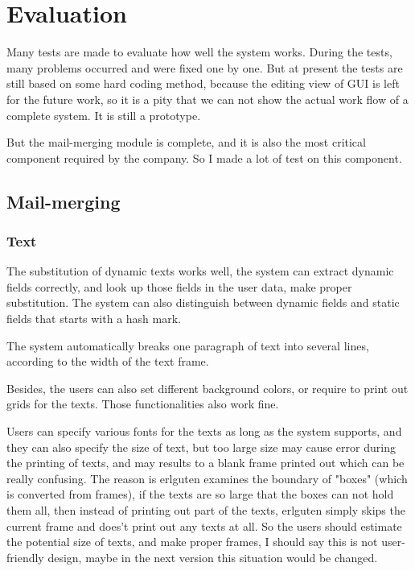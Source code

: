 \documentclass[12pt,twoside,a4paper]{report}
\begin{document}
\chapter{Evaluation}
  
  Many tests are made to evaluate how well the system works. During the tests, many problems occurred and were fixed one by one. But at present the tests are still based on some hard coding method, because the editing view of GUI is left for the future work, so it is a pity that we can not show the actual work flow of a complete system. It is still a prototype.

  But the mail-merging module is complete, and it is also the most critical component required by the company. So I made a lot of test on this component.
  
\section{Mail-merging}
\subsection{Text}

  The substitution of dynamic texts works well, the system can extract dynamic fields correctly, and look up those fields in the user data, make proper substitution. The system can also distinguish between dynamic fields and static fields that starts with a hash mark. 

  The system automatically breaks one paragraph of text into several lines, according to the width of the text frame. 

  Besides, the users can also set different background colors, or require to print out grids for the texts. Those functionalities also work fine.

  Users can specify various fonts for the texts as long as the system supports, and they can also specify the size of text, but too large size may cause error during the printing of texts, and may results to a blank frame printed out which can be really confusing. The reason is erlguten examines the boundary of "boxes" (which is converted from frames), if the texts are so large that the boxes can not hold them all, then instead of printing out part of the texts, erlguten simply skips the current frame and does't print out any texts at all. So the users should estimate the potential size of texts, and make proper frames, I should say this is not user-friendly design, maybe in the next version this situation would be changed. 
\end{document}
